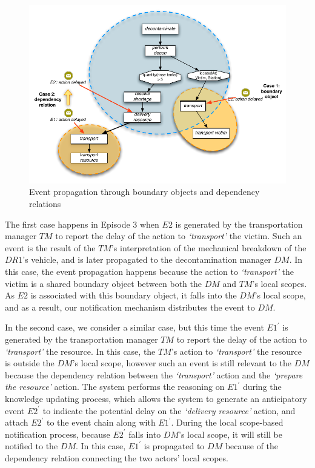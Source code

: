 \begin{figure}[htbp] %
	\centering
	\includegraphics[width=5.8in]{two_cases_in_event_proagation.pdf} 
	\caption{Event propagation through boundary objects and dependency relations}
	\label{fig:two_cases_in_event_proagation}
\end{figure}

The first case happens in Episode 3 when $E2$ is generated by the transportation manager $TM$ to report the delay of the action to \emph{`transport'} the victim. Such an event is the result of the $TM$'s interpretation of the mechanical breakdown of the $DR1$'s vehicle, and is later propagated to the decontamination manager $DM$. In this case, the event propagation happens because the action to \emph{`transport'} the victim is a shared boundary object between both the $DM$ and $TM$'s local scopes. As $E2$ is associated with this boundary object, it falls into the $DM$'s local scope, and as a result, our notification mechanism distributes the event to $DM$.

In the second case, we consider a similar case, but this time the event $E1^\prime$ is generated by the transportation manager $TM$ to report the delay of the action to \emph{`transport'} the resource. In this case, the $TM$'s action to \emph{`transport'} the resource is outside the $DM$'s local scope, however such an event is still relevant to the $DM$ because the dependency relation between the \emph{`transport'} action and the \emph{`prepare the resource'} action. The system performs the reasoning on $E1^\prime$ during the knowledge updating process, which allows the system to generate an anticipatory event $E2^\prime$ to indicate the potential delay on the \emph{`delivery resource'} action, and attach $E2^\prime$ to the event chain along with $E1^\prime$. During the local scope-based notification process, because $E2^\prime$ falls into $DM$'s local scope, it will still be notified to the $DM$. In this case, $E1^\prime$ is propagated to $DM$ because of the dependency relation connecting the two actors' local scopes.
